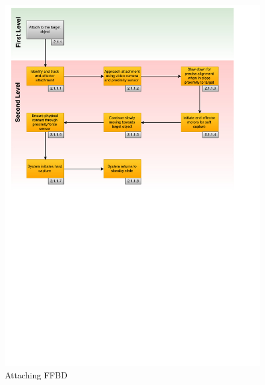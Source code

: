 \begin{figure}[H]
\centering
\includegraphics[width=\textwidth, height=0.94\textheight, keepaspectratio]{Figures/FFBD_attach}
\caption{Attaching \acrshort{FFBD}}
\label{fig:FFBD_attach}
\end{figure}


